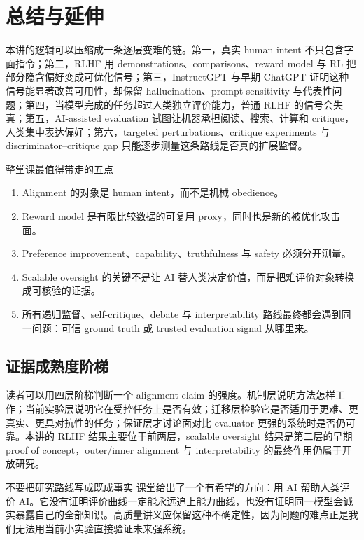 \section{总结与延伸}

本讲的逻辑可以压缩成一条逐层变难的链。第一，真实 human intent 不只包含字面指令；第二，RLHF 用 demonstrations、comparisons、reward model 与 RL 把部分隐含偏好变成可优化信号；第三，InstructGPT 与早期 ChatGPT 证明这种信号能显著改善可用性，却保留 hallucination、prompt sensitivity 与代表性问题；第四，当模型完成的任务超过人类独立评价能力，普通 RLHF 的信号会失真；第五，AI-assisted evaluation 试图让机器承担阅读、搜索、计算和 critique，人类集中表达偏好；第六，targeted perturbations、critique experiments 与 discriminator--critique gap 只能逐步测量这条路线是否真的扩展监督。

\begin{importantbox}{整堂课最值得带走的五点}
\begin{enumerate}
  \item Alignment 的对象是 human intent，而不是机械 obedience。
  \item Reward model 是有限比较数据的可复用 proxy，同时也是新的被优化攻击面。
  \item Preference improvement、capability、truthfulness 与 safety 必须分开测量。
  \item Scalable oversight 的关键不是让 AI 替人类决定价值，而是把难评价对象转换成可核验的证据。
  \item 所有递归监督、self-critique、debate 与 interpretability 路线最终都会遇到同一问题：可信 ground truth 或 trusted evaluation signal 从哪里来。
\end{enumerate}
\end{importantbox}

\subsection{证据成熟度阶梯}

读者可以用四层阶梯判断一个 alignment claim 的强度。机制层说明方法怎样工作；当前实验层说明它在受控任务上是否有效；迁移层检验它是否适用于更难、更真实、更具对抗性的任务；保证层才讨论面对比 evaluator 更强的系统时是否仍可靠。本讲的 RLHF 结果主要位于前两层，scalable oversight 结果是第二层的早期 proof of concept，outer/inner alignment 与 interpretability 的最终作用仍属于开放研究。

\begin{warningbox}{不要把研究路线写成既成事实}
课堂给出了一个有希望的方向：用 AI 帮助人类评价 AI。它没有证明评价曲线一定能永远追上能力曲线，也没有证明同一模型会诚实暴露自己的全部知识。高质量讲义应保留这种不确定性，因为问题的难点正是我们无法用当前小实验直接验证未来强系统。
\end{warningbox}

